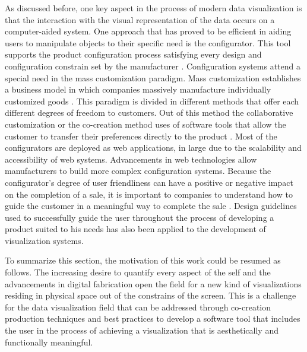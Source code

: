 \documentclass[../medieninformatik-arbeit.tex]{subfiles}
\begin{document}
As discussed before, one key aspect in the process of modern data visualization
is that the interaction with the visual representation of the data occurs on a
computer-aided system. One approach that has proved to be efficient in aiding
users to manipulate objects to their specific need is the configurator. This
tool supports the product configuration process satisfying every design and
configuration constrain set by the manufacturer \cite{hedin1998product}. 
Configuration systems attend a special need in the mass customization
paradigm. Mass customization establishes a business model in which companies
massively manufacture individually customized 
goods \cite{felfernig2014knowledge}.
This paradigm is divided in different methods that offer each different degrees
of freedom to customers. Out of this method the
collaborative customization or the co-creation method uses of software
tools that allow the customer to transfer their preferences directly to the
product \cite{pine1999mass,piller2006user}. Most of the configurators are
deployed as web applications, in large due to the scalability and accessibility
of web systems. Advancements in web technologies allow manufacturers to build
more complex configuration systems. 
Because the configurator's degree of user friendliness can have a positive or
negative impact on the completion of a sale, it is important to companies to
understand how to guide the customer in a meaningful way to complete the
sale \cite{rolland2012commerce,abbasi2012s}. Design guidelines used to successfully guide the user throughout the process of developing a product suited to his needs \cite{Konstanzer20078609220,abbasi2012s} has also been applied to the development of visualization systems. 

To summarize this section, the motivation of this work could be resumed as
follows. The increasing desire to quantify every aspect of the self and the advancements in digital 
fabrication open the field for a new kind of visualizations residing 
in physical space out of the constrains of the screen. This is a challenge for
the data visualization field that can be addressed through co-creation production techniques and best
practices to develop a software tool that includes the user in
the process of achieving a visualization
that is aesthetically and functionally meaningful. 
\end{document}
